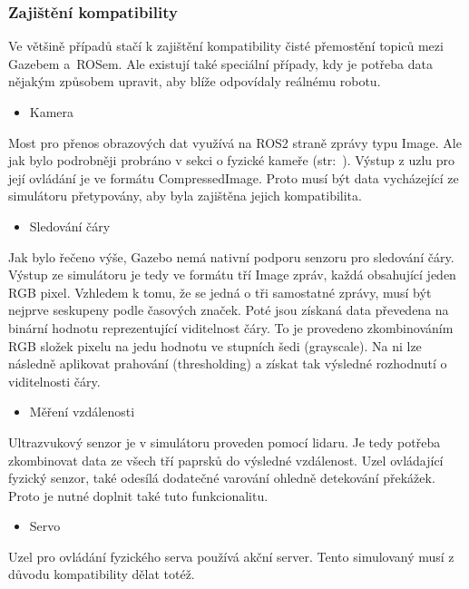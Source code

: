 \newpage
\subsubsection*{Zajištění kompatibility}
Ve většině případů stačí k zajištění kompatibility čisté přemostění topiců mezi Gazebem a~ROSem. Ale existují také speciální případy, kdy je potřeba data nějakým způsobem upravit, aby blíže odpovídaly reálnému robotu. 

\begin{itemize}[leftmargin=*]
	\item{Kamera}
\end{itemize}
\vspace*{-0.5em}
Most pro přenos obrazových dat využívá na ROS2 straně zprávy typu Image. Ale jak bylo podrobněji probráno v sekci o fyzické kameře (str:~\pageref{implementation:camera}). Výstup z uzlu pro její ovládání je ve formátu CompressedImage. Proto musí být data vycházející ze simulátoru přetypovány, aby byla zajištěna jejich kompatibilita.

\begin{itemize}[leftmargin=*]
	\item{Sledování čáry}
\end{itemize}
\vspace*{-0.5em}
Jak bylo řečeno výše, Gazebo nemá nativní podporu senzoru pro sledování čáry. Výstup ze simulátoru je tedy ve formátu tří Image zpráv, každá obsahující jeden RGB pixel. Vzhledem k tomu, že se jedná o tři samostatné zprávy, musí být nejprve seskupeny podle časových značek. Poté jsou získaná data převedena na binární hodnotu reprezentující viditelnost čáry. To je provedeno zkombinováním RGB složek pixelu na jedu hodnotu ve stupních šedi (grayscale). Na ni lze následně aplikovat prahování (thresholding) a získat tak výsledné rozhodnutí o viditelnosti čáry.

\begin{itemize}[leftmargin=*]
	\item{Měření vzdálenosti}
\end{itemize}
\vspace*{-0.5em}
Ultrazvukový senzor je v simulátoru proveden pomocí lidaru. Je tedy potřeba zkombinovat data ze všech tří paprsků do výsledné vzdálenost. Uzel ovládající fyzický senzor, také odesílá dodatečné varování ohledně detekování překážek. Proto je nutné doplnit také tuto funkcionalitu.

\begin{itemize}[leftmargin=*]
	\item{Servo}
\end{itemize}
\vspace*{-0.5em}
Uzel pro ovládání fyzického serva používá akční server. Tento simulovaný musí z důvodu kompatibility dělat totéž.

